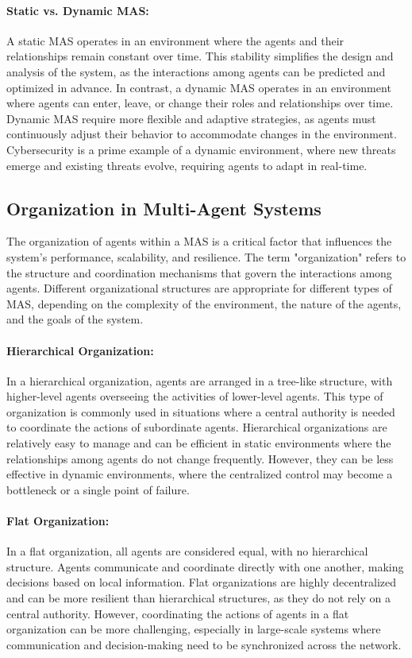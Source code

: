 \paragraph{Static vs. Dynamic MAS:}
A static MAS operates in an environment where the agents and their relationships remain constant over time. This stability simplifies the design and analysis of the system, as the interactions among agents can be predicted and optimized in advance. In contrast, a dynamic MAS operates in an environment where agents can enter, leave, or change their roles and relationships over time. Dynamic MAS require more flexible and adaptive strategies, as agents must continuously adjust their behavior to accommodate changes in the environment. Cybersecurity is a prime example of a dynamic environment, where new threats emerge and existing threats evolve, requiring agents to adapt in real-time.

\subsection{Organization in Multi-Agent Systems}

The organization of agents within a MAS is a critical factor that influences the system's performance, scalability, and resilience. The term "organization" refers to the structure and coordination mechanisms that govern the interactions among agents. Different organizational structures are appropriate for different types of MAS, depending on the complexity of the environment, the nature of the agents, and the goals of the system.

\paragraph{Hierarchical Organization:}
In a hierarchical organization, agents are arranged in a tree-like structure, with higher-level agents overseeing the activities of lower-level agents. This type of organization is commonly used in situations where a central authority is needed to coordinate the actions of subordinate agents. Hierarchical organizations are relatively easy to manage and can be efficient in static environments where the relationships among agents do not change frequently. However, they can be less effective in dynamic environments, where the centralized control may become a bottleneck or a single point of failure.

\paragraph{Flat Organization:}
In a flat organization, all agents are considered equal, with no hierarchical structure. Agents communicate and coordinate directly with one another, making decisions based on local information. Flat organizations are highly decentralized and can be more resilient than hierarchical structures, as they do not rely on a central authority. However, coordinating the actions of agents in a flat organization can be more challenging, especially in large-scale systems where communication and decision-making need to be synchronized across the network.

